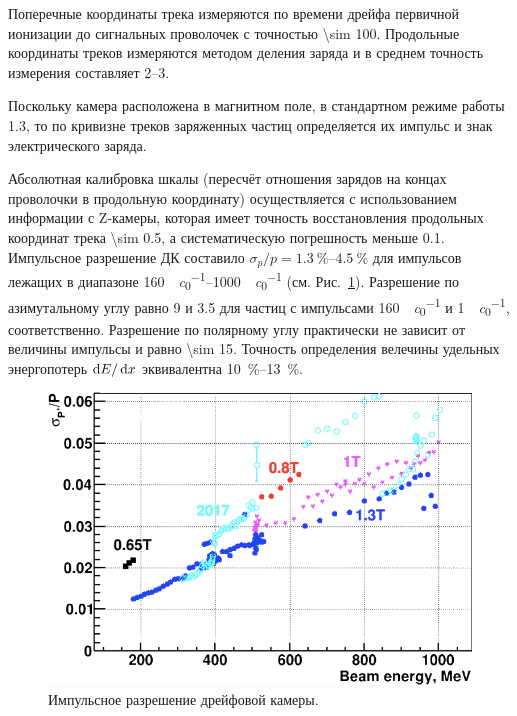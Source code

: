 Поперечные координаты трека измеряются по времени дрейфа первичной ионизации до сигнальных проволочек с точностью \SI{\sim 100}{\umr}.
Продольные координаты треков измеряются методом деления заряда и в среднем точность измерения составляет \SIrange{2}{3}{\mmr}. 

Поскольку камера расположена в магнитном поле,
в стандартном режиме работы \SI{1.3}{\teslaru},
то по кривизне треков заряженных частиц определяется их импульс и знак электрического заряда.

Абсолютная калибровка шкалы (пересчёт отношения зарядов на концах проволочки в продольную координату) осуществляется с использованием информации с Z-камеры,
которая имеет точность восстановления продольных координат трека \SI{\sim 0.5}{\mmr},
а систематическую погрешность меньше \SI{0.1}{\mmr}.
Импульсное разрешение ДК составило
$\sigma_p / p = \SIrange{1.3}{4.5}{\percent}$
для импульсов лежащих в диапазоне
\SIrange{160}{1000}{\MeVr \per \clight} (см. Рис.~\ref{fig:dc_mom_res}).
Разрешение по азимутальному углу равно \SI{9}{\mradianru} и \SI{3.5}{\mradianru}
для частиц с импульсами \SI{160}{\MeVr \per \clight} и \SI{1}{\GeVr \per \clight},
соответственно.
Разрешение по полярному углу практически не зависит от величины импульсы
и равно \SI{\sim 15}{\mradianru}.
Точность определения велечины удельных энергопотерь $\dif E / \dif x$
эквивалентна \SIrange{10}{13}{\percent}.


\begin{figure}
    \centering
    \includegraphics[height=.5\textwidth]{img/cmd3_detector/dc_mom_res.png}
    \caption{Импульсное разрешение дрейфовой камеры.}\label{fig:dc_mom_res}
\end{figure}



